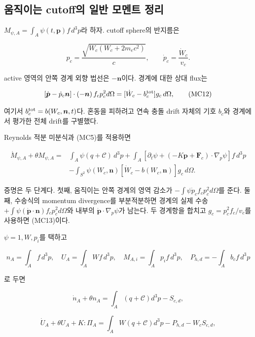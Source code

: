\hypertarget{uxc6c0uxc9c1uxc774uxb294-cutoffuxc758-uxc77cuxbc18-uxbaa8uxba58uxd2b8-uxc815uxb9ac}{%
\subsection{움직이는 cutoff의 일반 모멘트 정리}\label{uxc6c0uxc9c1uxc774uxb294-cutoffuxc758-uxc77cuxbc18-uxbaa8uxba58uxd2b8-uxc815uxb9ac}}

\(M_{\psi,A}=\int_A\psi(t,\boldsymbol p)f\,d^3p\)라 하자. cutoff sphere의 반지름은

\[
p_c=\frac{\sqrt{W_c(W_c+2m_ec^2)}}c,
\qquad\dot p_c=\frac{\dot W_c}{v_c}.
\tag{MC11}
\]

active 영역의 안쪽 경계 외향 법선은 \(-\boldsymbol n\)이다. 경계에 대한 상대 flux는

\[
[\dot{\boldsymbol p}-\dot p_c\boldsymbol n]\cdot(-\boldsymbol n)
\,f_c p_c^2d\Omega
=[\dot W_c-b_c^{\rm tot}]g_c\,d\Omega,
\tag{MC12}
\]

여기서 \(b_c^{\rm tot}=b(W_c,\boldsymbol n,t)\)다. 혼동을 피하려고 연속 충돌 drift 자체의 기호 \(b_c\)와 경계에서 평가한 전체 drift를 구별했다.

Reynolds 적분 미분식과 (MC5)를 적용하면

\[
\begin{split}
\dot M_{\psi,A}+\theta M_{\psi,A}
={}&\int_A\psi(q+\mathcal C)\,d^3p
+\int_A[\partial_t\psi+
(-K\boldsymbol p+\boldsymbol F_c)\cdot\nabla_p\psi]f\,d^3p\\
&-\int_{S^2}\psi(W_c,\boldsymbol n)
[\dot W_c-b(W_c,\boldsymbol n)]g_c\,d\Omega.
\end{split}
\tag{MC13}
\]

증명은 두 단계다. 첫째, 움직이는 안쪽 경계의 영역 감소가 \(-\int\psi\dot p_cf_cp_c^2d\Omega\)를 준다. 둘째, 수송식의 momentum divergence를 부분적분하면 경계의 실제 수송 \(+\int\psi(\dot{\boldsymbol p}\cdot\boldsymbol n)f_cp_c^2d\Omega\)와 내부의 \(\dot{\boldsymbol p}\cdot\nabla_p\psi\)가 남는다. 두 경계항을 합치고 \(g_c=p_c^2f_c/v_c\)를 사용하면 (MC13)이다.

\(\psi=1,W,p_i\)를 택하고

\[
n_A=\int_A f\,d^3p,\quad U_A=\int_AWf\,d^3p,\quad
M_{A,i}=\int_Ap_if\,d^3p,\quad
P_{h,d}=-\int_A b_c f\,d^3p
\tag{MC14}
\]

로 두면

\[
\dot n_A+\theta n_A=\int_A(q+\mathcal C)d^3p-S_{c,d},
\tag{MC15}
\]

\[
\dot U_A+\theta U_A+K:\Pi_A
=\int_AW(q+\mathcal C)d^3p-P_{h,d}-W_cS_{c,d},
\tag{MC16}
\]

